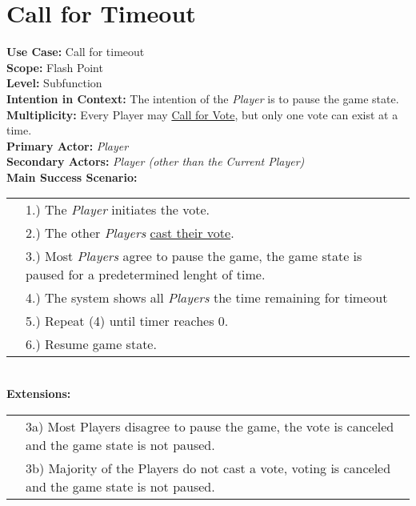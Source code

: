 \documentclass{article}
\begin{document}
	\section*{Call for Timeout}
	\textbf{Use Case:} Call for timeout\\
	\textbf{Scope:} Flash Point\\
	\textbf{Level:} Subfunction\\
	\textbf{Intention in Context:} The intention of the \textit{Player} is to pause the game state.\\
	\textbf{Multiplicity: } Every Player may \underline{Call for Vote}, but only one vote can exist at a time.\\
	\textbf{Primary Actor:} \textit{Player}\\
	\textbf{Secondary Actors:} \textit{Player (other than the Current Player)}\\
	\textbf{Main Success Scenario:}\\
	\begin{tabular}{l l}
		&1.) The \textit{Player} initiates the vote.\\
		&2.) The other \textit{Players} \underline{cast their vote}.\\
		&3.) Most \textit{Players} agree to pause the game, the game state is paused for a predetermined lenght of time.\\
		&4.) The system shows all \textit{Players} the time remaining for timeout\\
		&5.) Repeat (4) until timer reaches 0.\\
		&6.) Resume game state.\\
	\end{tabular}\\
	\textbf{Extensions:}\\
	\begin{tabular}{l l}
		&3a) Most Players disagree to pause the game, the vote is canceled and the game state is not paused.\\
		&3b) Majority of the Players do not cast a vote, voting is canceled and the game state is not paused.
	\end{tabular}
\end{document}
